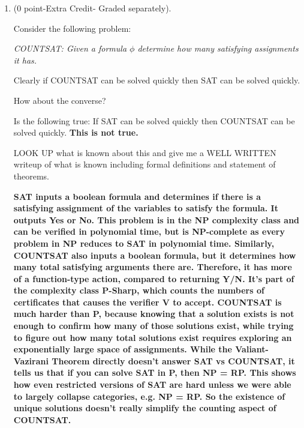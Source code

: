 \documentclass[12pt]{article}
\begin{document}
\begin{enumerate}
\begin{enumerate}
\end{enumerate}

\vfill

\centerline{\bf GO TO NEXT PAGE} 

\newpage

\item
(0 point-Extra Credit- Graded separately). 

Consider the following problem:

{\it COUNTSAT: Given a formula $\phi$ determine how many satisfying assignments it has.}

Clearly if COUNTSAT can be solved quickly then SAT can be solved quickly. 

How about the converse? 

Is the following true: If SAT can be solved quickly then COUNTSAT can be solved quickly. 
\textbf{This is not true.}

LOOK UP what is known about this and give me a WELL WRITTEN writeup of what is known
including formal definitions and statement of theorems. 

\textbf{SAT inputs a boolean formula and determines if there is a satisfying assignment of the variables to satisfy the formula. It outputs Yes or No. This problem is in the NP complexity class and can be verified in polynomial time, but is NP-complete as every problem in NP reduces to SAT in polynomial time. Similarly, COUNTSAT also inputs a boolean formula, but it determines how many total satisfying arguments there are. Therefore, it has more of a function-type action, compared to returning Y/N. It's part of the complexity class P-Sharp, which counts the numbers of certificates that causes the verifier V to accept. COUNTSAT is much harder than P, because knowing that a solution exists is not enough to confirm how many of those solutions exist, while trying to figure out how many total solutions exist requires exploring an exponentially large space of assignments. While the Valiant-Vazirani Theorem directly doesn't answer SAT vs COUNTSAT, it tells us that if you can solve SAT in P, then NP = RP. This shows how even restricted versions of SAT are hard unless we were able to largely collapse categories, e.g. NP = RP. So the existence of unique solutions doesn't really simplify the counting aspect of COUNTSAT.}

\end{enumerate}
\end{document}
